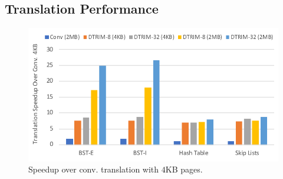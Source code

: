 \subsection{Translation Performance}

\begin{figure}[t]
	\centering
	\includegraphics[width=1.0\columnwidth]{graphs/speedup.pdf}
	\caption{Speedup over conv. translation with  $4$KB pages.}
	\label{fig:perf}
\end{figure}

